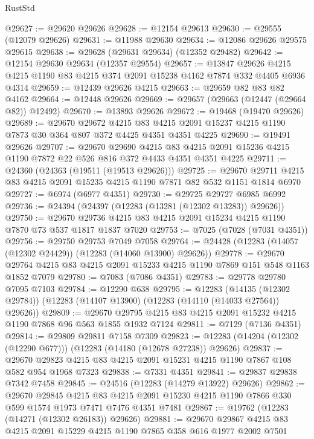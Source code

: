 \begin{lexlean}{RustStd}
\begin{coremodule}
@29627 := @29620 @29626
@29628 := @12154 @29613
@29630 := @29555 (@12079 @29626)
@29631 := @11988 @29630
@29634 := @12086 @29626 @29575 @29615
@29638 := @29628 (@29631 @29634) (@12352 @29482)
@29642 := @12154 @29630 @29634 (@12357 @29554)
@29657 := @13847
    @29626
    @4215
    @4215
    @1190
    @83
    @4215
    @374
    @2091
    @15238
    @4162
    @7874
    @332
    @4405
    @6936
    @4314
@29659 := @12439 @29626 @4215
@29663 := @29659 @82 @83 @82 @4162
@29664 := @12448 @29626
@29669 := @29657 (@29663 (@12447 (@29664 @82)) @12492)
@29670 := @13893 @29626
@29672 := @19468 (@19470 @29626)
@29689 := @29670
    @29672
    @4215
    @83
    @4215
    @2091
    @15237
    @4215
    @1190
    @7873
    @30
    @364
    @807
    @372
    @4425
    @4351
    @4351
    @4225
@29690 := @19491 @29626
@29707 := @29670
    @29690
    @4215
    @83
    @4215
    @2091
    @15236
    @4215
    @1190
    @7872
    @22
    @526
    @816
    @372
    @4433
    @4351
    @4351
    @4225
@29711 := @24360 (@24363 (@19511 (@19513 @29626)))
@29725 := @29670 @29711 @4215 @83 @4215 @2091 @15235 @4215 @1190 @7871 @82 @532 @1151 @1814 @6970
@29727 := @6974 (@6977 @4351)
@29730 := @29725 @29727 @6985 @6992
@29736 := @24394 (@24397 (@12283 (@13281 (@12302 @13283)) @29626))
@29750 := @29670 @29736 @4215 @83 @4215 @2091 @15234 @4215 @1190 @7870 @73 @537 @1817 @1837 @7020
@29753 := @7025 (@7028 (@7031 @4351))
@29756 := @29750 @29753 @7049 @7058
@29764 := @24428 (@12283 (@14057 (@12302 @24429)) (@12283 (@14060 @13900) @29626))
@29778 := @29670 @29764 @4215 @83 @4215 @2091 @15233 @4215 @1190 @7869 @151 @548 @1163 @1852 @7079
@29780 := @7083 (@7086 @4351)
@29783 := @29778 @29780 @7095 @7103
@29784 := @12290 @638
@29795 := @12283
    (@14135 (@12302 @29784))
    (@12283 (@14107 @13900) (@12283 (@14110 (@14033 @27564)) @29626))
@29809 := @29670 @29795 @4215 @83 @4215 @2091 @15232 @4215 @1190 @7868 @96 @563 @1855 @1932 @7124
@29811 := @7129 (@7136 @4351)
@29814 := @29809 @29811 @7158 @7309
@29823 := @12283 (@14204 (@12302 (@12290 @677))) (@12283 (@14180 (@12678 @27238)) @29626)
@29837 := @29670 @29823 @4215 @83 @4215 @2091 @15231 @4215 @1190 @7867 @108 @582 @954 @1968 @7323
@29838 := @7331 @4351
@29841 := @29837 @29838 @7342 @7458
@29845 := @24516 (@12283 (@14279 @13922) @29626)
@29862 := @29670
    @29845
    @4215
    @83
    @4215
    @2091
    @15230
    @4215
    @1190
    @7866
    @330
    @599
    @1574
    @1973
    @7471
    @7476
    @4351
    @7481
@29867 := @19762 (@12283 (@14271 (@12302 @26183)) @29626)
@29881 := @29670 @29867 @4215 @83 @4215 @2091 @15229 @4215 @1190 @7865 @358 @616 @1977 @2002 @7501

\end{coremodule}
\end{lexlean}
